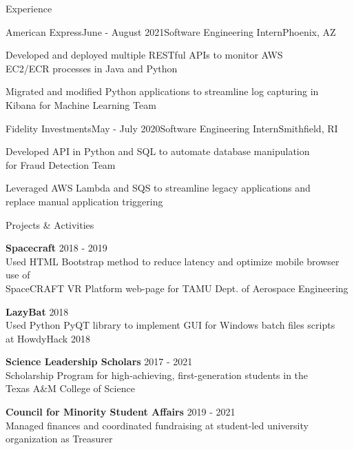 \documentclass{resume} %
\begin{document}
\begin{rSection}{Experience}

\begin{rSubsection}{American Express}{June - August 2021}{Software Engineering Intern}{Phoenix, AZ}
\item Developed and deployed multiple RESTful APIs to monitor AWS\\ EC2/ECR processes in Java and Python
\item Migrated and modified Python applications to streamline log capturing in\\ Kibana for Machine Learning Team
\end{rSubsection}


\begin{rSubsection}{Fidelity Investments}{May - July 2020}{Software Engineering Intern}{Smithfield, RI}
\item Developed API in Python and SQL to automate database manipulation\\ for Fraud Detection Team 
\item Leveraged AWS Lambda and SQS to streamline legacy applications and\\ replace manual application triggering
\end{rSubsection}

\end{rSection}





\begin{rSection}{Projects \& Activities}

{\bf Spacecraft}  \hfill {2018 - 2019} \\
Used HTML Bootstrap method to reduce latency and optimize mobile browser use of \\SpaceCRAFT VR Platform web-page for TAMU Dept. of Aerospace Engineering 

{\bf LazyBat}  \hfill {2018} \\
Used Python PyQT library to implement GUI for Windows batch files scripts \\at HowdyHack 2018

{\bf Science Leadership Scholars}  \hfill {2017 - 2021} \\
Scholarship Program for high-achieving, first-generation students in the \\Texas A\&M College of Science 

{\bf Council for Minority Student Affairs}  \hfill {2019 - 2021} \\
Managed finances and coordinated fundraising at student-led university\\ organization as Treasurer


\end{rSection}




\end{document}

